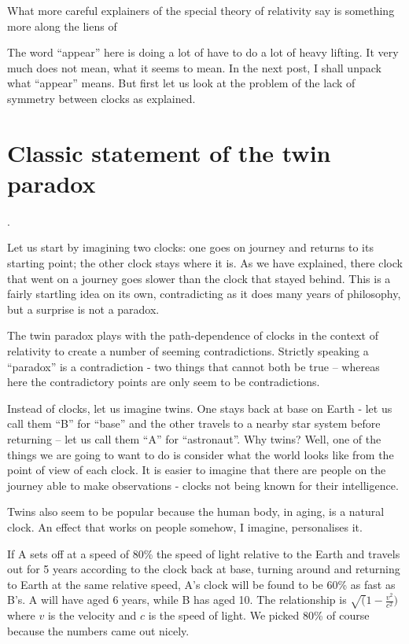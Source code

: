 \documentclass[a4paper]{report}
\begin{document}
What more careful explainers of the special theory of relativity say is something more along the liens of 


The word ``appear'' here is doing a lot of have to do a lot of heavy lifting. It very much does not mean, what it seems to mean. In the next post, I shall unpack what ``appear'' means. But first let us look at the problem of the lack of symmetry between clocks as explained.

\section*{Classic statement of the twin paradox}.

Let us start by imagining two clocks: one goes on journey and returns to its starting point; the other clock stays where it is. As we have explained, there clock that went on a journey goes slower than the clock that stayed behind. This is a fairly startling idea on its own, contradicting as it does many years of philosophy, but a surprise is not a paradox.

The twin paradox plays with the path-dependence of clocks in the context of relativity to create a number of seeming contradictions. Strictly speaking a ``paradox'' is a contradiction - two things that cannot both be true -- whereas here the contradictory points are only seem to be contradictions.

Instead of clocks, let us imagine twins. One stays back at base on Earth - let us call them ``B'' for ``base'' and the other travels to a nearby star system before returning -- let us call them ``A'' for ``astronaut''. Why twins? Well, one of the things we are going to want to do is consider what the world looks like from the point of view of each clock. It is easier to imagine that there are people on the journey able to make observations - clocks not being known for their intelligence.

Twins also seem to be popular because the human body, in aging, is a natural clock. An effect that works on people somehow, I imagine, personalises it.

If A sets off at a speed of 80\% the speed of light relative to the Earth and travels out for 5 years according to the clock back at base, turning around and returning to Earth at the same relative speed, A's clock will be found to be 60\% as fast as B's. A will have aged 6 years, while B has aged 10. The relationship is $\sqrt(1 - \frac{v^2}{c^2})$ where $v$ is the velocity and $c$ is the speed of light. We picked 80\% of course because the numbers came out nicely.
\end{document}
